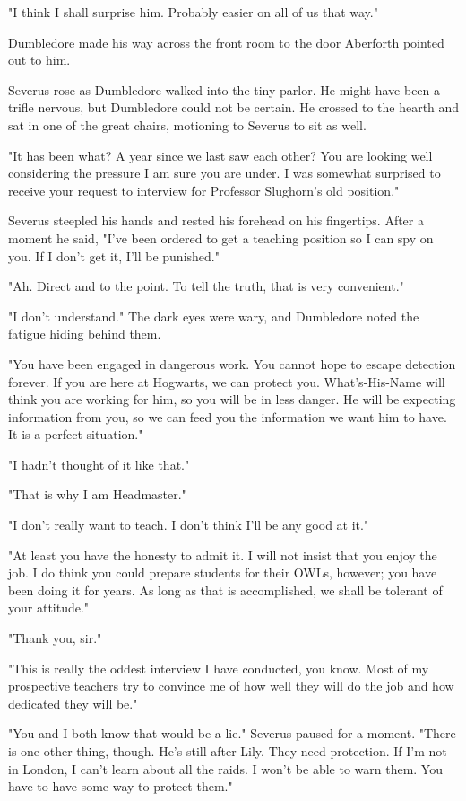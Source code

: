 \documentclass[a4paper,11pt]{article}
\begin{document}
"I think I shall surprise him. Probably easier on all of us that way."

Dumbledore made his way across the front room to the door Aberforth pointed out to him.

Severus rose as Dumbledore walked into the tiny parlor. He might have been a trifle nervous, but Dumbledore could not be certain. He crossed to the hearth and sat in one of the great chairs, motioning to Severus to sit as well.

"It has been what? A year since we last saw each other? You are looking well considering the pressure I am sure you are under. I was somewhat surprised to receive your request to interview for Professor Slughorn's old position."

Severus steepled his hands and rested his forehead on his fingertips. After a moment he said, "I've been ordered to get a teaching position so I can spy on you. If I don't get it, I'll be punished."

"Ah. Direct and to the point. To tell the truth, that is very convenient."

"I don't understand." The dark eyes were wary, and Dumbledore noted the fatigue hiding behind them.

"You have been engaged in dangerous work. You cannot hope to escape detection forever. If you are here at Hogwarts, we can protect you. What's-His-Name will think you are working for him, so you will be in less danger. He will be expecting information from you, so we can feed you the information we want him to have. It is a perfect situation."

"I hadn't thought of it like that."

"That is why I am Headmaster."

"I don't really want to teach. I don't think I'll be any good at it."

"At least you have the honesty to admit it. I will not insist that you enjoy the job. I do think you could prepare students for their OWLs, however; you have been doing it for years. As long as that is accomplished, we shall be tolerant of your attitude."

"Thank you, sir."

"This is really the oddest interview I have conducted, you know. Most of my prospective teachers try to convince me of how well they will do the job and how dedicated they will be."

"You and I both know that would be a lie." Severus paused for a moment. "There is one other thing, though. He's still after Lily. They need protection. If I'm not in London, I can't learn about all the raids. I won't be able to warn them. You have to have some way to protect them."
\end{document}
